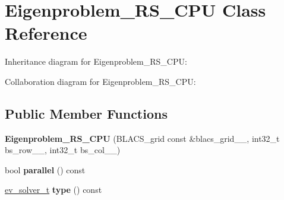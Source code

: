 \hypertarget{class_eigenproblem___r_s___c_p_u}{}\section{Eigenproblem\+\_\+\+R\+S\+\_\+\+C\+P\+U Class Reference}
\label{class_eigenproblem___r_s___c_p_u}


Inheritance diagram for Eigenproblem\+\_\+\+R\+S\+\_\+\+C\+P\+U\+:


Collaboration diagram for Eigenproblem\+\_\+\+R\+S\+\_\+\+C\+P\+U\+:
\subsection*{Public Member Functions}
\begin{DoxyCompactItemize}
\item 
\hypertarget{class_eigenproblem___r_s___c_p_u_a88c070521f539a16e5a9593f7fceb8d9}{}{\bfseries Eigenproblem\+\_\+\+R\+S\+\_\+\+C\+P\+U} (B\+L\+A\+C\+S\+\_\+grid const \&blacs\+\_\+grid\+\_\+\+\_\+, int32\+\_\+t bs\+\_\+row\+\_\+\+\_\+, int32\+\_\+t bs\+\_\+col\+\_\+\+\_\+)\label{class_eigenproblem___r_s___c_p_u_a88c070521f539a16e5a9593f7fceb8d9}

\item 
\hypertarget{class_eigenproblem___r_s___c_p_u_a43d190cc0f98da04d4f12f257b502868}{}bool {\bfseries parallel} () const \label{class_eigenproblem___r_s___c_p_u_a43d190cc0f98da04d4f12f257b502868}

\item 
\hypertarget{class_eigenproblem___r_s___c_p_u_a528360794b75d2772421b3175a89b748}{}\hyperlink{eigenproblem_8h_a203f2c57422a6e64834e6e9ab85982bf}{ev\+\_\+solver\+\_\+t} {\bfseries type} () const \label{class_eigenproblem___r_s___c_p_u_a528360794b75d2772421b3175a89b748}

\end{DoxyCompactItemize}
